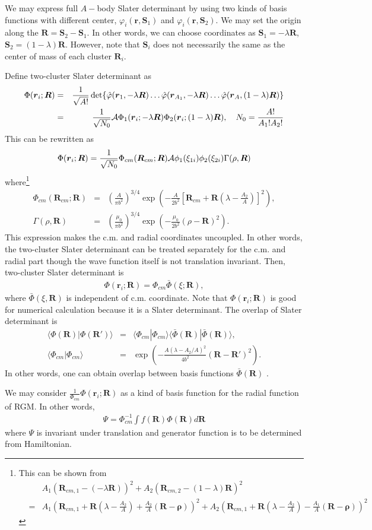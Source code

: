 \documentclass[11pt]{article}
\def\bm{\boldsymbol}
\newcommand{\bea}{\begin{eqnarray}}
\newcommand{\eea}{\end{eqnarray}}
\newcommand{\no}{\nonumber \\}
\newcommand{\vrho}{{\bm \rho}}
\newcommand{\vr}{{\bm r}}
\newcommand{\vR}{{\bm R}}
\newcommand{\la}{\langle}
\newcommand{\ra}{\rangle}
\begin{document}
We may express full $A-$body Slater determinant 
by using two kinds of basis functions with different center,
$\varphi_i(\vr,{\bm S}_1)$ and $\varphi_i(\vr,{\bm S}_2)$.
We may set the origin 
along the $\vR={\bm S}_2-{\bm S}_1$.  
In other words, we can choose coordinates as
${\bm S}_1=-\lambda \vR$, ${\bm S}_2=(1-\lambda) \vR$.
However, note that ${\bm S}_i$ does not necessarily the 
same as the center of mass of each cluster $\vR_i$. 

Define two-cluster Slater determinant as
\bea 
\Phi(\vr_{i};\vR)
&=&\frac{1}{\sqrt{A!}}\det \{ 
  \hat{\varphi}(\vr_1,-\lambda\vR)\dots 
  \hat{\varphi}(\vr_{A_1},-\lambda\vR) 
  \dots \hat{\varphi}(\vr_{A},(1-\lambda)\vR) \} \no 
 &=&\frac{1}{\sqrt{N_0}}{\cal A} \Phi_1(\vr_i; -\lambda \vR)
   \Phi_2(\vr_i; (1-\lambda) \vR), \quad N_0=\frac{A!}{A_1!A_2!}
\eea 
This can be rewritten as 
\bea 
\Phi(\vr_{i};\vR)
=\frac{1}{\sqrt{N_0}}\Phi_{cm}(\vR_{cm};\vR)
 {\cal A} \phi_1(\xi_{1i})\phi_2(\xi_{2i})
 \Gamma(\rho,\vR)
\eea 
where\footnote{
This can be shown from
\bea 
& &A_1(\vR_{cm,1}-(-\lambda \vR))^2+A_2(\vR_{cm,2}-(1-\lambda) \vR)^2 \no 
&=& A_1(\vR_{cm,1}+\vR(\lambda-\frac{A_2}{A})+\frac{A_2}{A}(\vR-\vrho)  )^2
+A_2(\vR_{cm,1}+\vR(\lambda-\frac{A_2}{A})-\frac{A_1}{A}(\vR-\vrho) )^2
\eea 
} 
\bea 
\Phi_{cm}(\vR_{cm};\vR)
&=& (\frac{A}{\pi b^2})^{3/4}\exp\left( 
    -\frac{A}{2b^2}[\vR_{cm}+\vR(\lambda-\frac{A_2}{A})]^2 \right) ,
    \no 
\Gamma(\rho,\vR)&=& (\frac{\mu_0}{\pi b^2})^{3/4}
 \exp(-\frac{\mu_0}{2b^2}(\rho-\vR)^2).    
\eea 
This expression makes the c.m. and radial coordinates uncoupled. In other words, the two-cluster Slater determinant 
can be treated separately for the c.m. and radial part
though the wave function itself is not translation invariant. 
Then, two-cluster Slater determinant is 
\bea 
\Phi(\vr_i;\vR)=\Phi_{cm}\bar{\Phi}(\xi;\vR),
\eea 
where $\bar{\Phi}(\xi,\vR)$ is independent of c.m. coordinate. 
Note that $\Phi(\vr_i;\vR)$ is good for numerical
calculation because it is a Slater determinant.
The overlap of Slater determinant is 
\bea 
\la \Phi(\vR)|\Phi(\vR')\ra 
&=&\la \Phi_{cm}|\Phi_{cm}\ra 
 \la \bar{\Phi}(\vR)|\bar{\Phi}(\vR)\ra ,\no 
\la \Phi_{cm}|\Phi_{cm}\ra
&=& \exp\left( -\frac{A(\lambda-A_2/A)^2}{4b^2}(\vR-\vR')^2\right) . 	
\eea 
In other words, one can obtain overlap between
basis functions $\bar{\Phi}(\vR) $ .

We may consider $\frac{1}{\Phi_{cm}}\Phi(\vr_i;\vR)$
as a kind of basis function for the radial function 
of RGM.  In other words,
\bea 
\Psi =\Phi_{cm}^{-1}\int f(\vR)\Phi(\vR) d\vR 
\eea 
where $\Psi$ is invariant under translation
and generator function is to be determined from Hamiltonian. 
\end{document}
